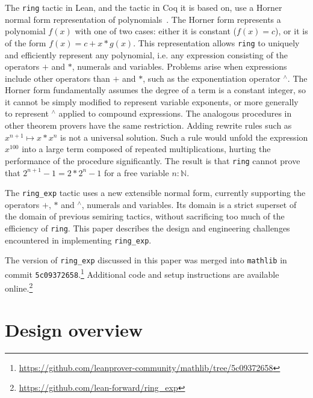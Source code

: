 \documentclass{llncs}
\newcommand{\Q}{\mathbb{Q}}
\newcommand{\lean}[1]{\texttt{#1}\xspace} %
\newcommand{\mathlib}{\texttt{mathlib}\xspace}
\newcommand{\pow}{{${}^\wedge$}\xspace}
\newcommand{\ring}{\lean{ring}}
\newcommand{\ringexp}{\lean{ring\_exp}}
\begin{document}
The \ring tactic in Lean, and the tactic in Coq it is based on,
use a Horner normal form representation of polynomials~\cite{ring-tactic}.
The Horner form represents a polynomial $f(x)$ with one of two cases:
either it is constant ($f(x) = c$), or it is of the form $f(x) = c + x * g(x)$.
This representation
allows \ring to uniquely and efficiently represent any polynomial,
i.e. any expression consisting of the operators $+$ and $*$, numerals and variables.
Problems arise when expressions include other operators than $+$ and $*$, such as the exponentiation operator \pow.
The Horner form fundamentally assumes the degree of a term is a constant integer,
so it cannot be simply modified to represent variable exponents,
or more generally to represent \pow applied to compound expressions.
The analogous procedures in other theorem provers have the same restriction.
Adding rewrite rules such as $x^{n+1} \mapsto x * x^n$ is not a universal solution.
Such a rule would unfold the expression $x^{100}$ into a large term composed of repeated multiplications,
hurting the performance of the procedure significantly.
The result is that \ring cannot prove that $2^{n+1} - 1 = 2 * 2^n - 1$ for a free variable $n : \mathbb{N}$.

The \ringexp tactic uses a new extensible normal form, currently supporting the operators $+$, $*$ and \pow, numerals and variables.
Its domain is a strict superset of the domain of previous semiring tactics,
without sacrificing too much of the efficiency of \ring.
This paper describes the design and engineering challenges encountered in implementing \ringexp.

The version of \ringexp discussed in this paper was merged into \mathlib in commit \texttt{5c09372658}.\footnote{\url{https://github.com/leanprover-community/mathlib/tree/5c09372658}}
Additional code and setup instructions are available online.\footnote{\url{https://github.com/lean-forward/ring_exp}}

\section{Design overview}
\end{document}
